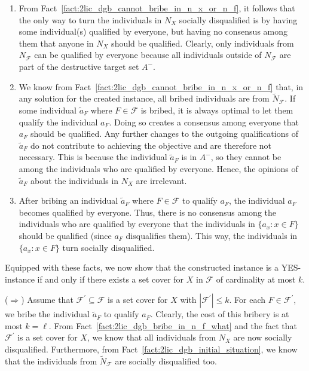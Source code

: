 \documentclass[
    12pt,               %
    a4paper,            %
    bibtotoc,           %
    pointlessnumbers,   %
    ngerman,            %
    titlepage,          %
    leqno,              %
    ]{scrarticle}       %
\newcommand\factref{Fact~\ref}
\begin{document}
\begin{Proof}
\begin{enumerate}[
    topsep=-4pt,
    leftmargin=*,
    itemindent=4.96em,
    label={\textit{Fact \ref*{thm:2lic_dgb_npc}.\arabic*}:},
    ref={\ref*{thm:2lic_dgb_npc}.\arabic*}
]
\item \label{fact:2lic_dgb_need_individuals_qualified_by_everyone}
From \factref{fact:2lic_dgb_cannot_bribe_in_n_x_or_n_f}, it follows that the only way to turn the individuals in $N_X$ socially disqualified is by having some individual(s) qualified by everyone, but having no consensus among them that anyone in $N_X$ should be qualified. Clearly, only individuals from $N_\mathcal{F}$ can be qualified by everyone because all individuals outside of $N_\mathcal{F}$ are part of the destructive target set $A^-$.

\item \label{fact:2lic_dgb_bribe_in_n_f_how}
We know from \factref{fact:2lic_dgb_cannot_bribe_in_n_x_or_n_f} that, in any solution for the created instance, all bribed individuals are from $\tilde{N}_\mathcal{F}$. If some individual $\tilde{a}_F$ where $F \in \mathcal{F}$ is bribed, it is always optimal to let them qualify the individual $a_F$. Doing so creates a consensus among everyone that $a_F$ should be qualified. Any further changes to the outgoing qualifications of $\tilde{a}_F$ do not contribute to achieving the objective and are therefore not necessary. This is because the individual $\tilde{a}_F$ is in $A^-$, so they cannot be among the individuals who are qualified by everyone. Hence, the opinions of $\tilde{a}_F$ about the individuals in $N_X$ are irrelevant.

\item \label{fact:2lic_dgb_bribe_in_n_f_what}
After bribing an individual $\tilde{a}_F$ where $F \in \mathcal{F}$ to qualify $a_F$, the individual $a_F$ becomes qualified by everyone. Thus, there is no consensus among the individuals who are qualified by everyone that the individuals in $\{ a_x : x \in F \}$ should be qualified (since $a_F$ disqualifies them). This way, the individuals in $\{ a_x : x \in F \}$ turn socially disqualified.
\end{enumerate}



Equipped with these facts, we now show that the constructed instance is a YES-instance if and only if there exists a set cover for $X$ in $\mathcal{F}$ of cardinality at most $k$.

($\Rightarrow$) Assume that $\mathcal{F}^\prime \subseteq \mathcal{F}$ is a set cover for $X$ with $|\mathcal{F}^\prime| \leq k$. For each $F \in \mathcal{F}^\prime$, we bribe the individual $\tilde{a}_F$ to qualify $a_F$. Clearly, the cost of this bribery is at most $k = \ell$. From \factref{fact:2lic_dgb_bribe_in_n_f_what} and the fact that $\mathcal{F}^\prime$ is a set cover for $X$, we know that all individuals from $N_X$ are now socially disqualified. Furthermore, from \factref{fact:2lic_dgb_initial_situation}, we know that the individuals from $\tilde{N}_\mathcal{F}$ are socially disqualified too.


\end{Proof}
\end{document}
